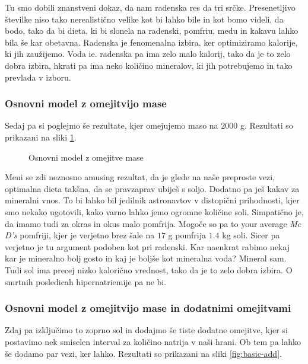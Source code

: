 \documentclass[a4paper]{article}
\begin{document}
Tu smo dobili znanstveni dokaz, da nam radenska res da tri srčke. Presenetljivo številke niso tako
nerealistično velike kot bi lahko bile in kot bomo videli, da bodo, tako da bi dieta, ki bi slonela
na radenski, pomfriu, medu in kakavu lahko bila še kar obetavna. Radenska je fenomenalna izbira, ker 
optimiziramo kalorije, ki jih zaužijemo. Voda ie. radenska pa ima zelo malo kalorij, tako da je to
zelo dobra izbira, hkrati pa ima neko količino mineralov, ki jih potrebujemo in tako prevlada v izboru.

\subsubsection{Osnovni model z omejitvijo mase}
Sedaj pa si poglejmo še rezultate, kjer omejujemo maso na $2000$ g. Rezultati so prikazani na 
sliki \ref{fig:basic}. \\

\begin{figure}[H]
    \centering
    \caption{Osnovni model z omejitve mase}
    \label{fig:basic}
\end{figure}

Meni se zdi neznosno amusing rezultat, da je glede na naše preproste vezi, optimalna dieta takšna, da se
pravzaprav ubiješ s soljo. Dodatno pa ješ kakav za mineralni vnos. To bi lahko bil jedilnik astronavtov v 
distopični prihodnosti, kjer smo nekako ugotovili, kako varno lahko jemo ogromne količine soli. Simpatično je,
da imamo tudi za okras in okus malo pomfrija. Mogoče so pa to your average \textit{Mc D's} pomfriji, kjer je
verjetno brez šale na $17$ g pomfrija $1.4$ kg soli. Sicer pa verjetno je tu argument podoben kot pri radenski.
Kar naenkrat rabimo nekaj kar je mineralno bolj gosto in kaj je boljše kot mineralna voda? Mineral sam. Tudi sol 
ima precej nizko kalorično vrednost, tako da je to zelo dobra izbira. O smrtnih posledicah hipernatriemije pa
ne bi.

\subsubsection{Osnovni model z omejitvijo mase in dodatnimi omejitvami}
Zdaj pa izključimo to zoprno sol in dodajmo še tiste dodatne omejitve, kjer si postavimo nek smiselen interval
za količino natrija v naši hrani. Ob tem pa lahko še dodamo par vezi, ker lahko. Rezultati so prikazani na
sliki \ref{fig:basic-add}. \\
\end{document}
